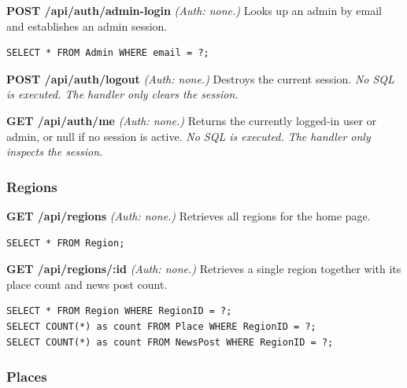 \textbf{POST /api/auth/admin-login} \textit{(Auth: none.)}
Looks up an admin by email and establishes an admin session.
\begin{lstlisting}[language=MySQL]
SELECT * FROM Admin WHERE email = ?;
\end{lstlisting}

\textbf{POST /api/auth/logout} \textit{(Auth: none.)}
Destroys the current session.
\textit{No SQL is executed. The handler only clears the session.}

\textbf{GET /api/auth/me} \textit{(Auth: none.)}
Returns the currently logged-in user or admin, or null if no session is active.
\textit{No SQL is executed. The handler only inspects the session.}

\subsubsection{Regions}

\textbf{GET /api/regions} \textit{(Auth: none.)}
Retrieves all regions for the home page.
\begin{lstlisting}[language=MySQL]
SELECT * FROM Region;
\end{lstlisting}

\textbf{GET /api/regions/:id} \textit{(Auth: none.)}
Retrieves a single region together with its place count and news post count.
\begin{lstlisting}[language=MySQL]
SELECT * FROM Region WHERE RegionID = ?;
SELECT COUNT(*) as count FROM Place WHERE RegionID = ?;
SELECT COUNT(*) as count FROM NewsPost WHERE RegionID = ?;
\end{lstlisting}

\subsubsection{Places}

